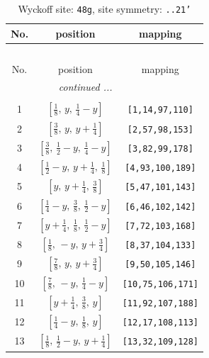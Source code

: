 \documentclass[fleqn,8pt]{jsarticle}
\begin{document}
\begin{longtable}{ccc}
\caption{Wyckoff site: {\tt 48g}, site symmetry: {\tt ..21'}}
 \\
 \hline \hline
No. & position & mapping \\ \hline \endfirsthead

\multicolumn{2}{l}{\tablename\ \thetable{}} \\
 \hline \hline
No. & position & mapping \\ \hline \endhead

 \hline \hline
\multicolumn{2}{r}{\footnotesize\it continued ...} \\ \endfoot

 \hline \hline
\multicolumn{2}{r}{} \\ \endlastfoot

1 & $\left[ \frac{1}{8},\, y,\, \frac{1}{4} - y \right]$ & {\tt [1,14,97,110]} \\ \hline
2 & $\left[ \frac{3}{8},\, y,\, y + \frac{1}{4} \right]$ & {\tt [2,57,98,153]} \\ \hline
3 & $\left[ \frac{3}{8},\, \frac{1}{2} - y,\, \frac{1}{4} - y \right]$ & {\tt [3,82,99,178]} \\ \hline
4 & $\left[ \frac{1}{2} - y,\, y + \frac{1}{4},\, \frac{1}{8} \right]$ & {\tt [4,93,100,189]} \\ \hline
5 & $\left[ y,\, y + \frac{1}{4},\, \frac{3}{8} \right]$ & {\tt [5,47,101,143]} \\ \hline
6 & $\left[ \frac{1}{4} - y,\, \frac{3}{8},\, \frac{1}{2} - y \right]$ & {\tt [6,46,102,142]} \\ \hline
7 & $\left[ y + \frac{1}{4},\, \frac{1}{8},\, \frac{1}{2} - y \right]$ & {\tt [7,72,103,168]} \\ \hline
8 & $\left[ \frac{1}{8},\, - y,\, y + \frac{3}{4} \right]$ & {\tt [8,37,104,133]} \\ \hline
9 & $\left[ \frac{7}{8},\, y,\, y + \frac{3}{4} \right]$ & {\tt [9,50,105,146]} \\ \hline
10 & $\left[ \frac{7}{8},\, - y,\, \frac{1}{4} - y \right]$ & {\tt [10,75,106,171]} \\ \hline
11 & $\left[ y + \frac{1}{4},\, \frac{3}{8},\, y \right]$ & {\tt [11,92,107,188]} \\ \hline
12 & $\left[ \frac{1}{4} - y,\, \frac{1}{8},\, y \right]$ & {\tt [12,17,108,113]} \\ \hline
13 & $\left[ \frac{1}{8},\, \frac{1}{2} - y,\, y + \frac{1}{4} \right]$ & {\tt [13,32,109,128]} \\ \hline

\end{longtable}
\end{document}
